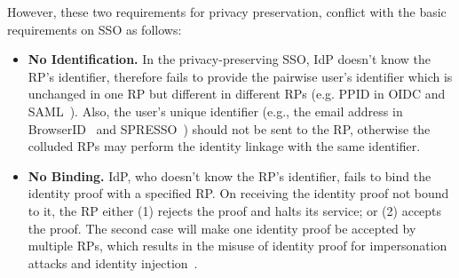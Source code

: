 However, these two requirements for privacy preservation,  conflict with the basic requirements on SSO as follows: %
\begin{itemize}
	\item \textbf{No Identification.} In the privacy-preserving SSO, IdP doesn't know the RP's identifier, therefore fails to provide the  pairwise user's identifier which is unchanged in one RP but different in different RPs (e.g. PPID in OIDC and SAML~\cite{OpenIDConnect,SAMLIdentifier}). Also, the user's unique identifier (e.g., the email address in BrowserID~\cite{BrowserID} and SPRESSO~\cite{SPRESSO}) should not be sent to the RP, otherwise the colluded RPs may perform the identity linkage with the same identifier.

	\item \textbf{No Binding.} IdP, who doesn't know the RP's identifier, fails to bind the identity proof with a specified RP.
On receiving the identity proof not bound to it, the RP either (1) rejects the proof and halts its service; or (2) accepts the proof.
The second case will make  one identity proof  be accepted by multiple RPs, which results in the misuse of identity proof for impersonation attacks and identity injection~\cite{ChenPCTKT14,FettKS16,WangZLG16}.


\end{itemize}
